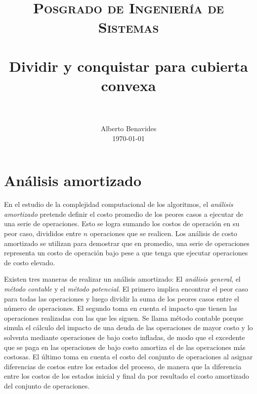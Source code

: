 \documentclass[paper=leter, fontsize=11pt]{scrartcl}
\title{
		\usefont{OT1}{bch}{b}{n}
		\normalfont \normalsize \textsc{Posgrado de Ingeniería de Sistemas} \\ [25pt]
		\horrule{0.5pt} \\[0.4cm]
		\huge Dividir y conquistar para cubierta convexa \\
		\horrule{2pt} \\[0.5cm]
}
\author{
		\normalfont 								\normalsize
        Alberto Benavides\\[-3pt]		\normalsize
        \today
}
\date{}
\numberwithin{equation}{section}		%
\numberwithin{figure}{section}			%
\numberwithin{table}{section}				%
\begin{document}
\maketitle

\section{Análisis amortizado} \nocite{aa} \nocite{amortized-analysis} \nocite{union-find}
En el estudio de la complejidad computacional de los algoritmos, el \textit{análisis amortizado} pretende definir el costo promedio de los peores casos a ejecutar de una serie de operaciones. Esto se logra sumando los costos de operación en su peor caso, divididos entre $n$ operaciones que se realicen. Los análisis de costo amortizado se utilizan para demostrar que en promedio, una serie de operaciones representa un costo de operación bajo pese a que tenga que ejecutar operaciones de costo elevado.

Existen tres maneras de realizar un análisis amortizado: El \textit{análisis general}, el \textit{método contable} y el \textit{método potencial}. El primero implica encontrar el peor caso para todas las operaciones y luego dividir la suma de los peores casos entre el número de operaciones. El segundo toma en cuenta el impacto que tienen las operaciones realizadas con las que les siguen. Se llama método contable porque simula el cálculo del impacto de una deuda de las operaciones de mayor costo y lo solventa mediante operaciones de bajo costo infladas, de modo que el excedente que se paga en las operaciones de bajo costo amortiza el de las operaciones más costosas. El último toma en cuenta el costo del conjunto de operaciones al asignar diferencias de costos entre los estados del proceso, de manera que la diferencia entre los costos de los estados inicial y final da por resultado el costo amortizado del conjunto de operaciones.
\end{document}
